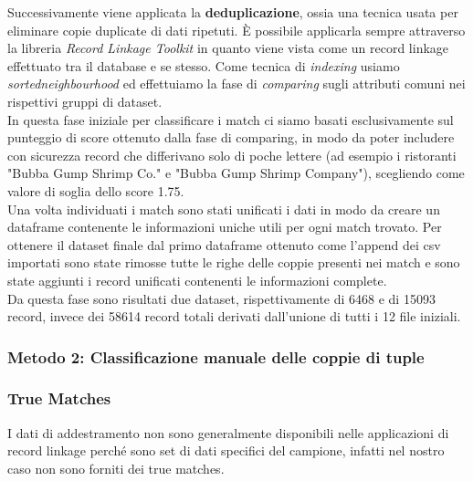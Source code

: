 \documentclass[a4paper,12pt]{article}
\begin{document}
\noindent Successivamente viene applicata la \textbf{deduplicazione}, ossia una tecnica usata per eliminare copie duplicate di dati ripetuti. È possibile applicarla sempre attraverso la libreria \textit{Record Linkage Toolkit} in quanto viene vista come un record linkage effettuato tra il database e se stesso. Come tecnica di \textit{indexing} usiamo \textit{sortedneighbourhood} ed effettuiamo la fase di \textit{comparing} sugli attributi comuni nei rispettivi gruppi di dataset. \\

\noindent In questa fase iniziale per classificare i match ci siamo basati esclusivamente sul punteggio di score ottenuto dalla fase di comparing, in modo da poter includere con sicurezza record che differivano solo di poche lettere (ad esempio i ristoranti "Bubba Gump Shrimp Co." e "Bubba Gump Shrimp Company"), scegliendo come valore di soglia dello score 1.75. \\

\noindent Una volta individuati i match sono stati unificati i dati in modo da creare un dataframe contenente le informazioni uniche utili per ogni match trovato. Per ottenere il dataset finale dal primo dataframe ottenuto come l'append dei csv importati sono state rimosse tutte le righe delle coppie presenti nei match e sono state aggiunti i record unificati contenenti le informazioni complete. \\

\noindent Da questa fase sono risultati due dataset, rispettivamente di 6468 e di 15093 record, invece dei 58614 record totali derivati dall'unione di tutti i 12 file iniziali.

\subsubsection{Metodo 2: Classificazione manuale delle coppie di tuple}

\subsubsection{True Matches}
I dati di addestramento non sono generalmente disponibili nelle applicazioni di record linkage perché sono set di dati specifici del campione, infatti nel nostro caso non sono forniti dei true matches. \\
\end{document}
